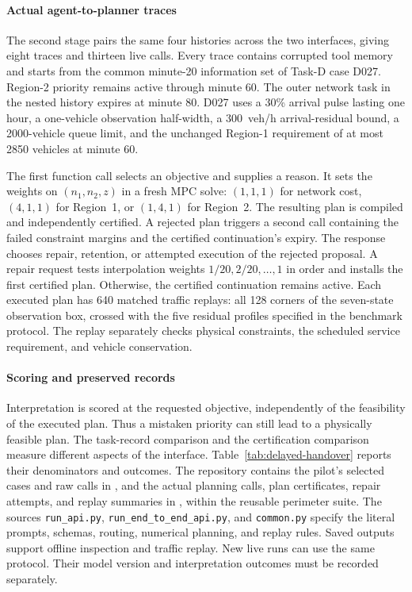 \documentclass[preprint,12pt]{elsarticle}
\begin{document}
\paragraph{Actual agent-to-planner traces}
The second stage pairs the same four histories across the two interfaces,
giving eight traces and thirteen live calls. Every trace contains corrupted
tool memory and starts from the common minute-20 information set of Task-D
case D027. Region-2 priority remains active through minute 60. The outer
network task in the nested history expires at minute 80. D027 uses a 30\%
arrival pulse lasting one hour, a one-vehicle observation half-width,
a 300~veh/h arrival-residual bound, a 2000-vehicle queue limit, and the
unchanged Region-1 requirement of at most 2850 vehicles at minute 60.

The first function call selects an objective and supplies a reason. It
sets the weights on $(n_1,n_2,z)$ in a fresh MPC solve: $(1,1,1)$ for network
cost, $(4,1,1)$ for Region~1, or $(1,4,1)$ for Region~2. The resulting plan
is compiled and independently certified. A rejected plan triggers a
second call containing the failed constraint margins and the certified
continuation's expiry. The response chooses repair, retention, or attempted
execution of the rejected proposal. A repair request tests interpolation
weights $1/20,2/20,\ldots,1$ in order and installs the first certified
plan. Otherwise, the certified continuation remains active. Each executed
plan has 640 matched traffic replays: all 128 corners of the seven-state
observation box, crossed with the five residual profiles specified in
the benchmark protocol. The replay separately checks physical constraints,
the scheduled service requirement, and vehicle conservation.

\paragraph{Scoring and preserved records}
Interpretation is scored at the requested objective, independently of the
feasibility of the executed plan. Thus a mistaken priority can still lead
to a physically feasible plan. The task-record comparison and the
certification comparison measure different aspects of the interface.
Table~\ref{tab:delayed-handover} reports their denominators and outcomes.
The repository contains the pilot's selected cases and raw calls in
, and the actual planning calls, plan certificates,
repair attempts, and replay summaries in ,
within the reusable perimeter suite. The sources \texttt{run\_api.py},
\texttt{run\_end\_to\_end\_api.py}, and \texttt{common.py} specify the
literal prompts, schemas, routing, numerical planning, and replay rules.
Saved outputs support offline inspection and traffic replay. New live
runs can use the same protocol. Their model version and interpretation
outcomes must be recorded separately.

\FloatBarrier

\setlength{\bibsep}{0pt}

\end{document}
